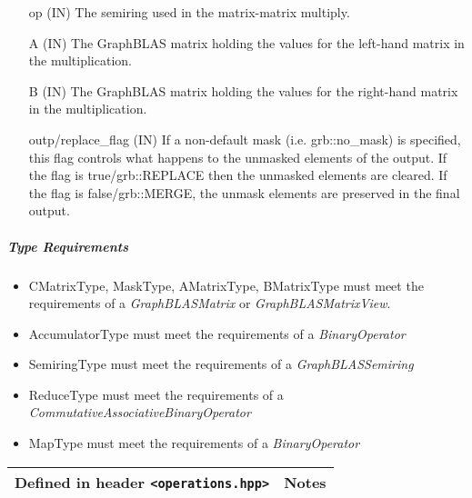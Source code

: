 \begin{itemize}[leftmargin=1.1in]
    \item[{\sf op}]   ({\sf IN}) The semiring used in the matrix-matrix
    multiply.

    \item[{\sf A}]    ({\sf IN}) The GraphBLAS matrix holding the values
    for the left-hand matrix in the multiplication.

    \item[{\sf B}]    ({\sf IN}) The GraphBLAS matrix holding the values for
    the right-hand matrix in the multiplication.

    \item[{\sf outp/replace\_flag}] ({\sf IN}) If a non-default mask (i.e. {\sf grb::no\_mask}) is specified,
    this flag controls what happens to the unmasked elements of the output.  If the flag is {\sf true/grb::REPLACE}
    then the unmasked elements are cleared.  If the flag is {\sf false/grb::MERGE}, the unmask elements are preserved in the final output. \\
\end{itemize}

\subparagraph{Type Requirements}

\begin{itemize}[leftmargin=1.1in]
    \item {\sf CMatrixType, MaskType, AMatrixType, BMatrixType} must meet the requirements of a \emph{GraphBLASMatrix} or \emph{GraphBLASMatrixView}.
    \item {\sf AccumulatorType} must meet the requirements of a \emph{BinaryOperator}
    \item {\sf SemiringType} must meet the requirements of a \emph{GraphBLASSemiring}
    \item {\sf ReduceType} must meet the requirements of a \emph{CommutativeAssociativeBinaryOperator}
    \item {\sf MapType} must meet the requirements of a \emph{BinaryOperator}
\end{itemize}

\begin{tabularx}{\textwidth}{X l}
Defined in header \texttt{<operations.hpp>}  &  \textbf{Notes} \\
\hline
\end{tabularx}

